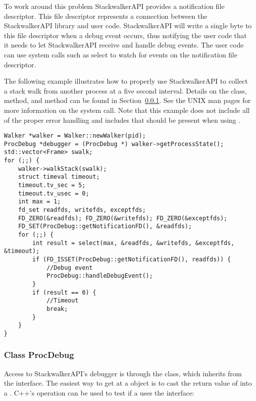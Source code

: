 To work around this problem StackwalkerAPI provides a notification file
descriptor. This file descriptor represents a connection between the
StackwalkerAPI library and user code. StackwalkerAPI will write a single byte to
this file descriptor when a debug event occurs, thus notifying the user code
that it needs to let StackwalkerAPI receive and handle debug events. The user
code can use system calls such as select to watch for events on the notification
file descriptor.

The following example illustrates how to properly use StackwalkerAPI to collect
a stack walk from another process at a five second interval. Details on the
 class,  method, and
 method can be
found in Section~\ref{subsubsec:procdebug}. See the UNIX man pages for more information on the
 system call. Note that this example does not include all of the proper
error handling and includes that should be present when using .

\begin{lstlisting}
Walker *walker = Walker::newWalker(pid);
ProcDebug *debugger = (ProcDebug *) walker->getProcessState();
std::vector<Frame> swalk;
for (;;) {
    walker->walkStack(swalk);		
    struct timeval timeout;
    timeout.tv_sec = 5;
    timeout.tv_usec = 0;
    int max = 1;
    fd_set readfds, writefds, exceptfds;
    FD_ZERO(&readfds); FD_ZERO(&writefds); FD_ZERO(&exceptfds);
    FD_SET(ProcDebug::getNotificationFD(), &readfds);
    for (;;) {
        int result = select(max, &readfds, &writefds, &exceptfds, &timeout);
        if (FD_ISSET(ProcDebug::getNotificationFD(), readfds)) {
            //Debug event
            ProcDebug::handleDebugEvent();
        }
        if (result == 0) {
            //Timeout
            break;
        }
    }
}
\end{lstlisting}


\subsubsection{Class ProcDebug}
\label{subsubsec:procdebug}

Access to StackwalkerAPI's debugger is through the  class, which
inherits from the  interface. The easiest way to get at a
 object is to cast the return value of
 into a . C++'s
 operation can be used to test if a  uses the
 interface:

